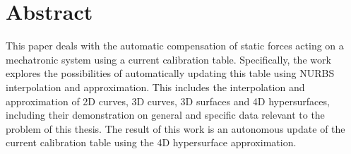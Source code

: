 \section*{Abstract}
This paper deals with the automatic compensation of static forces acting on a mechatronic system using a current calibration table. Specifically, the work explores the possibilities of automatically updating this table using NURBS interpolation and approximation. This includes the interpolation and approximation of 2D curves, 3D curves, 3D surfaces and 4D hypersurfaces, including their demonstration on general and specific data relevant to the problem of this thesis. The result of this work is an autonomous update of the current calibration table using the 4D hypersurface approximation.
\section*{}

\vspace*{\fill}
\newpage
